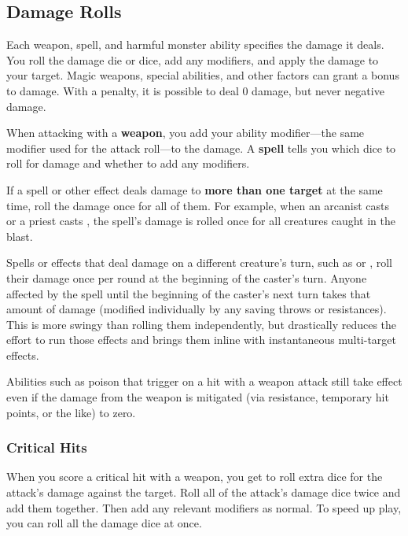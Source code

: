 \subsection{Damage Rolls}

Each weapon, spell, and harmful monster ability specifies the damage it deals. You roll the damage die or dice, add any modifiers, and apply the damage to your target. Magic weapons, special abilities, and other factors can grant a bonus to damage. With a penalty, it is possible to deal 0 damage, but never negative damage.

When attacking with a \textbf{weapon}, you add your ability modifier---the same modifier used for the attack roll---to the damage. A \textbf{spell} tells you which dice to roll for damage and whether to add any modifiers.

If a spell or other effect deals damage to \textbf{more than one target} at the same time, roll the damage once for all of them. For example, when an arcanist casts  or a priest casts , the spell's damage is rolled once for all creatures caught in the blast.

Spells or effects that deal damage on a different creature's turn, such as  or , roll their damage once per round at the beginning of the caster's turn. Anyone affected by the spell until the beginning of the caster's next turn takes that amount of damage (modified individually by any saving throws or resistances). This is more swingy than rolling them independently, but drastically reduces the effort to run those effects and brings them inline with instantaneous multi-target effects.

Abilities such as poison that trigger on a hit with a weapon attack still take effect even if the damage from the weapon is mitigated (via resistance, temporary hit points, or the like) to zero.

\subsubsection{Critical Hits} \label{sec:critical-hits}

When you score a critical hit with a weapon, you get to roll extra dice for the attack's damage against the target. Roll all of the attack's damage dice twice and add them together. Then add any relevant modifiers as normal. To speed up play, you can roll all the damage dice at once.


